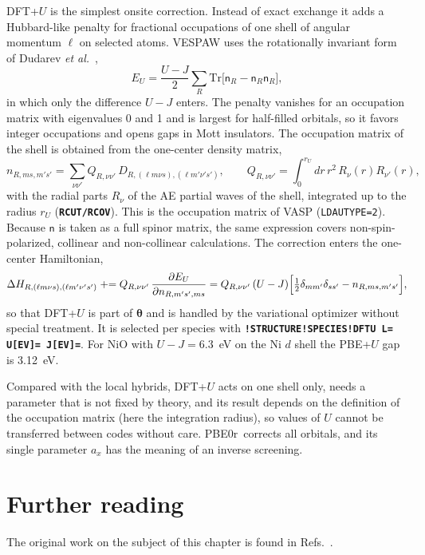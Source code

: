 \documentclass[11pt,a4paper,oneside]{book}
\newcommand{\vth}{\bm\theta}
\newcommand{\pbezero}{PBE0r}
\newcommand{\key}[1]{\textbf{\texttt{#1}}}
\begin{document}
DFT+$U$ is the simplest onsite correction. Instead of exact exchange it
adds a Hubbard-like penalty for fractional occupations of one shell
of angular momentum $\ell$ on selected atoms. VESPAW uses the rotationally
invariant form of Dudarev \emph{et al.}~\cite{dudarev98_prb57_1505},
\begin{equation}
  E_U=\frac{U-J}{2}\sum_R\mathrm{Tr}\bigl[\mathsf n_R-\mathsf n_R\mathsf n_R\bigr],
  \label{eq:dftu}
\end{equation}
in which only the difference $U-J$ enters. The penalty vanishes for an
occupation matrix with eigenvalues 0 and 1 and is largest for
half-filled orbitals, so it favors integer occupations and opens gaps
in Mott insulators. The occupation matrix of the shell is obtained from
the one-center density matrix,
\begin{equation}
  n_{R,m s,m's'}=\sum_{\nu\nu'}Q_{R,\nu\nu'}\,D_{R,(\ell m\nu s),(\ell m'\nu' s')},
  \qquad
  Q_{R,\nu\nu'}=\int_0^{r_U}dr\,r^2\,R_{\nu}(r)R_{\nu'}(r),
\end{equation}
with the radial parts $R_\nu$ of the AE partial waves of the shell,
integrated up to the radius $r_U$ (\key{RCUT/RCOV}). This is the
occupation matrix of VASP (\texttt{LDAUTYPE=2}). Because $\mathsf n$ is
taken as a full spinor matrix, the same expression covers
non-spin-polarized, collinear and non-collinear calculations. The
correction enters the one-center Hamiltonian,
\begin{equation}
  \Delta H_{R,(\ell m\nu s),(\ell m'\nu' s')}\mathrel{+}=
  Q_{R,\nu\nu'}\,\frac{\partial E_U}{\partial n_{R,m's',ms}}
  =Q_{R,\nu\nu'}\,(U-J)\Bigl[\tfrac12\delta_{mm'}\delta_{ss'}-n_{R,ms,m's'}\Bigr],
\end{equation}
so that DFT+$U$ is part of $\vth$ and is handled by the variational
optimizer without special treatment. It is selected per species with
\key{!STRUCTURE!SPECIES!DFTU L= U[EV]= J[EV]=}. For NiO with $U-J=6.3$~eV
on the Ni $d$ shell the PBE+$U$ gap is 3.12~eV.

Compared with the local hybrids, DFT+$U$ acts on one shell only, needs
a parameter that is not fixed by theory, and its result depends on
the definition of the occupation matrix (here the integration radius),
so values of $U$ cannot be transferred between codes without care.
\pbezero\ corrects all orbitals, and its single parameter $a_x$ has the
meaning of an inverse screening.


\section*{Further reading}
The original work on the subject of this chapter is found in
Refs.~\cite{becke93_jcp98_1372,perdew96_jcp105_9982,adamo99_jcp110_6158,heyd03_jcp118_8207,krukau06_jcp125_224106,paier05_jcp122_234102,lin16_jctc12_2242,bloechl11_prb84_205101,sotoudeh17_prb95_235150,dudarev98_prb57_1505}.
\end{document}
